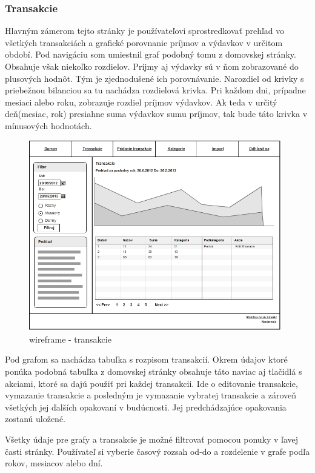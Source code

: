 \documentclass[12pt,oneside]{book}
\begin{document}
\subsubsection{Transakcie}
Hlavným zámerom tejto stránky je používateľovi sprostredkovať prehľad vo všetkých transakciách a grafické porovnanie príjmov a výdavkov v určitom období. Pod navigáciu som umiestnil graf podobný tomu z domovskej stránky. Obsahuje však niekoľko rozdielov. Príjmy aj výdavky sú v ňom zobrazované do plusových hodnôt. Tým je zjednodušené ich porovnávanie. Narozdiel od krivky s priebežnou bilanciou sa tu nachádza rozdielová krivka. Pri každom dni, prípadne mesiaci alebo roku, zobrazuje rozdiel príjmov výdavkov. Ak teda v určitý deň(mesiac, rok) presiahne suma výdavkov sumu príjmov, tak bude táto krivka v mínusových hodnotách. 
\begin{figure}[ht]
  \centering
      \includegraphics[width=11cm]{wireframe_transakcie}
  \caption{wireframe - transakcie}
  \label{wireframe - transakcie}
\end{figure} 

Pod grafom sa nachádza tabuľka s rozpisom transakcií. Okrem údajov ktoré ponúka podobná tabuľka z domovskej stránky obsahuje táto naviac aj tlačidlá s akciami, ktoré sa dajú použiť pri každej transakcii. Ide o editovanie transakcie, vymazanie transakcie a posledným je vymazanie vybratej transakcie a zároveň všetkých jej ďalších opakovaní  v budúcnosti. Jej predchádzajúce opakovania zostanú uložené.

Všetky údaje pre grafy a transakcie je možné filtrovať pomocou ponuky v ľavej časti stránky. Používateľ si vyberie časový rozsah od-do a rozdelenie v grafe podľa rokov, mesiacov alebo dní.
\end{document}
